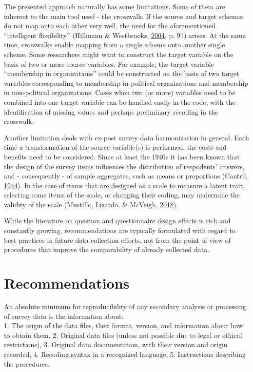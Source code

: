 \documentclass[12pt,]{article}
\begin{document}
The presented approach naturally has some limitations. Some of them are inherent to the main tool used - the crosswalk. If the source and target schemas do not map onto each other very well, the need for the aforementioned ``intelligent flexibility'' (Hillmann \& Westbrooks, \protect\hyperlink{ref-Hillmann2004}{2004}, p. 91) arises. At the same time, crosswalks enable mapping from a single scheme onto another single scheme. Some researchers might want to construct the target variable on the basis of two or more source variables. For example, the target variable ``membership in organizations'' could be constructed on the basis of two target variables corresponding to membership in political organizations and membership in non-political organizations. Cases when two (or more) variables need to be combined into one target variable can be handled easily in the code, with the identification of missing values and perhaps preliminary recoding in the crosswalk.

Another limitation deals with ex-post survey data harmonization in general. Each time a transformation of the source variable(s) is performed, the costs and benefits need to be considered. Since at least the 1940s it has been known that the design of the survey items influences the distribution of respodents' answers, and - consequently - of sample aggregates, such as means or proportions (Cantril, \protect\hyperlink{ref-Cantril1944}{1944}). In the case of items that are designed as a scale to measure a latent trait, selecting some items of the scale, or changing their coding, may undermine the validity of the scale (Mustillo, Lizardo, \& McVeigh, \protect\hyperlink{ref-Mustillo2018}{2018}).

While the literature on question and questionnaire design effects is rich and constantly growing, recommendations are typically formulated with regard to best practices in future data collection efforts, not from the point of view of procedures that improve the comparability of already collected data.

\hypertarget{recommendations}{%
\section{Recommendations}\label{recommendations}}

An absolute minimum for reproducibility of any secondary analysis or processing of survey data is the information about:\\
1. The origin of the data files, their format, version, and information about how to obtain them,
2. Original data files (unless not possible due to legal or ethical restrictions),
3. Original data documentation, with their version and origin recorded,
4. Recoding syntax in a recognized language,
5. Instructions describing the procedures.
\end{document}
